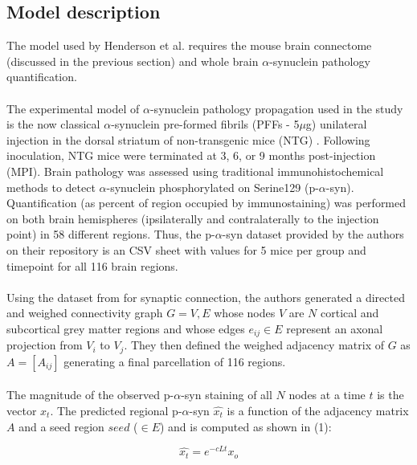 \subsection{Model description}
The model used by Henderson et al. requires the mouse brain connectome (discussed in the previous section) and whole brain $\alpha$-synuclein pathology quantification.\\
\\
The experimental model of $\alpha$-synuclein pathology propagation used in the study is the now classical $\alpha$-synuclein pre-formed fibrils (PFFs -  5$\mu$g) unilateral injection in the dorsal striatum of non-transgenic mice (NTG) \cite{Luk_2012, Henderson_2019}. Following inoculation, NTG mice were terminated at 3, 6, or 9 months post-injection (MPI). Brain pathology was assessed using traditional immunohistochemical methods to detect $\alpha$-synuclein phosphorylated on Serine129 (p-$\alpha$-syn). Quantification (as percent of region occupied by immunostaining) was performed on both brain hemispheres (ipsilaterally and contralaterally to the injection point) in 58 different regions. Thus, the p-$\alpha$-syn dataset provided by the authors on their repository is an CSV sheet with values for 5 mice per group and timepoint for all 116 brain regions.\\
\\
Using the dataset from \cite{Oh_2014} for synaptic connection, the authors generated a directed and weighed connectivity graph $G={V,E}$ whose nodes $V$ are $N$ cortical and subcortical grey matter regions and whose edges $e_{ij} \in E$ represent an axonal projection from $V_{i}$ to $V_{j}$. They then defined the weighed adjacency matrix of $G$ as $A = [A_{ij}]$ generating a final parcellation of 116 regions.\\
\\
The magnitude of the observed p-$\alpha$-syn staining of all $N$ nodes at a time $t$ is the vector $x_{t}$. The predicted regional p-$\alpha$-syn $\widehat{x_{t}}$ is a function of the adjacency matrix $A$ and a seed region $seed$ ($\in E$)  and is computed as shown in (1):

\begin{equation}
    \widehat{x_{t}}=e^{-cLt} x_{o}
\end{equation}

